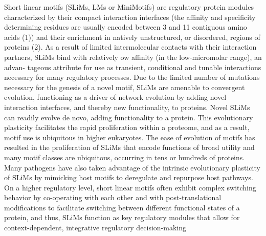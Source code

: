 Short linear motifs (SLiMs, LMs or MiniMotifs) are
regulatory protein modules characterized by their
compact interaction interfaces (the affinity and specificity
determining residues are usually encoded between 3 and
11 contiguous amino acids (1)) and their enrichment in
natively unstructured, or disordered, regions of proteins
(2). As a result of limited intermolecular contacts with
their interaction partners, SLiMs bind with relatively
ow affinity (in the low-micromolar range), an advan-
tageous attribute for use as transient, conditional and
tunable interactions necessary for many regulatory
processes. 
Due to the limited number of mutations
necessary for the genesis of a novel motif, SLiMs are
amenable to convergent evolution, functioning as a
driver of network evolution by adding novel interaction
interfaces, and thereby new functionality, to proteins. 
Novel SLiMs can readily evolve de novo, adding functionality to a protein.
This evolutionary plasticity facilitates the rapid proliferation
within a proteome, and as a result, motif use is ubiquitous
in higher eukaryotes.
The ease of evolution of motifs has resulted in the proliferation of
SLiMs that encode functions of broad utility and many
motif classes are ubiquitous, occurring in tens or hundreds
of proteins. Many pathogens have also taken advantage
of the intrinsic evolutionary plasticity of SLiMs by
mimicking host motifs to deregulate and repurpose host
pathways.
On a higher regulatory level, short linear motifs often
exhibit complex switching behavior by co-operating with
each other and with post-translational modifications to
facilitate switching between different functional states of
a protein, and thus, SLiMs function as key regulatory
modules that allow for context-dependent, integrative
regulatory decision-making

% 



